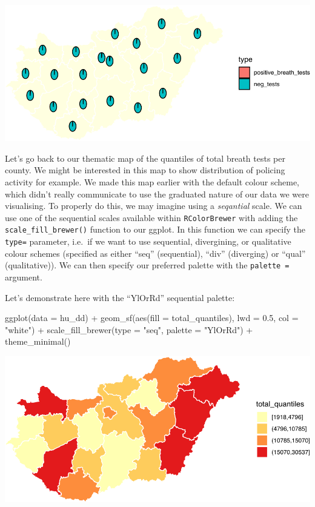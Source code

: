 \documentclass[
]{book}
\newenvironment{Shaded}{\begin{snugshade}}{\end{snugshade}}
\newcommand{\AttributeTok}[1]{\textcolor[rgb]{0.77,0.63,0.00}{#1}}
\newcommand{\FloatTok}[1]{\textcolor[rgb]{0.00,0.00,0.81}{#1}}
\newcommand{\FunctionTok}[1]{\textcolor[rgb]{0.00,0.00,0.00}{#1}}
\newcommand{\NormalTok}[1]{#1}
\newcommand{\SpecialCharTok}[1]{\textcolor[rgb]{0.00,0.00,0.00}{#1}}
\newcommand{\StringTok}[1]{\textcolor[rgb]{0.31,0.60,0.02}{#1}}
\begin{document}
\includegraphics{crime_mapping_files/figure-latex/unnamed-chunk-156-1.pdf}

Let's go back to our thematic map of the quantiles of total breath tests per county. We might be interested in this map to show distribution of policing activity for example. We made this map earlier with the default colour scheme, which didn't really communicate to use the graduated nature of our data we were visualising. To properly do this, we may imagine using a \emph{seqantial} scale. We can use one of the sequential scales available within \texttt{RColorBrewer} with adding the \texttt{scale\_fill\_brewer()} function to our ggplot. In this function we can specify the \texttt{type=} parameter, i.e.~if we want to use sequential, divergining, or qualitative colour schemes (specified as either ``seq'' (sequential), ``div'' (diverging) or ``qual'' (qualitative)). We can then specify our preferred palette with the \texttt{palette\ =} argument.

Let's demonstrate here with the ``YlOrRd'' sequential palette:

\begin{Shaded}
\begin{Highlighting}[]
\FunctionTok{ggplot}\NormalTok{(}\AttributeTok{data =}\NormalTok{ hu\_dd) }\SpecialCharTok{+} 
  \FunctionTok{geom\_sf}\NormalTok{(}\FunctionTok{aes}\NormalTok{(}\AttributeTok{fill =}\NormalTok{ total\_quantiles), }\AttributeTok{lwd =} \FloatTok{0.5}\NormalTok{, }\AttributeTok{col =} \StringTok{"white"}\NormalTok{) }\SpecialCharTok{+} 
  \FunctionTok{scale\_fill\_brewer}\NormalTok{(}\AttributeTok{type =} \StringTok{"seq"}\NormalTok{, }\AttributeTok{palette =} \StringTok{"YlOrRd"}\NormalTok{) }\SpecialCharTok{+} 
  \FunctionTok{theme\_minimal}\NormalTok{()}
\end{Highlighting}
\end{Shaded}

\includegraphics{crime_mapping_files/figure-latex/colourbbrewerratefill-1.pdf}
\end{document}
